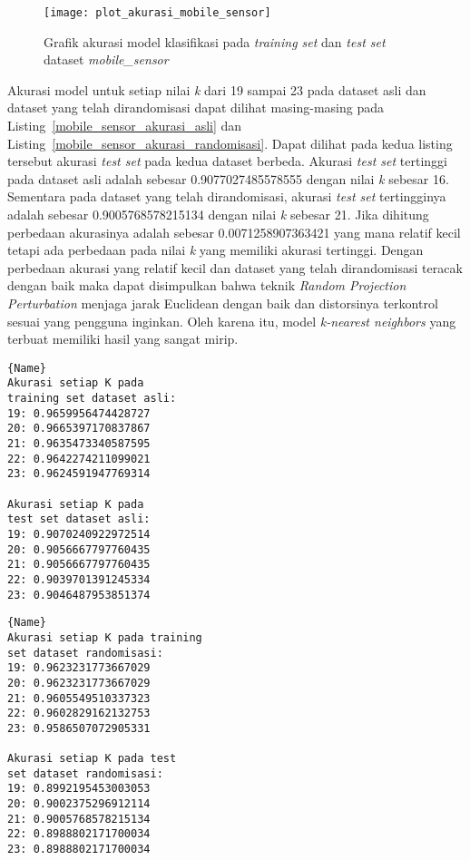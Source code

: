 \begin{figure}
	\centering
	\texttt{[image: plot\_akurasi\_mobile\_sensor]}
	\caption{Grafik akurasi model klasifikasi pada \textit{training set} dan \textit{test set} dataset \textit{mobile\_sensor}}
	\label{fig:plot_akurasi_mobile_sensor}
\end{figure}

Akurasi model untuk setiap nilai \textit{k} dari 19 sampai 23 pada dataset asli dan dataset yang telah dirandomisasi dapat dilihat masing-masing pada Listing~\ref{mobile_sensor_akurasi_asli} dan Listing~\ref{mobile_sensor_akurasi_randomisasi}. Dapat dilihat pada kedua listing tersebut akurasi \textit{test set} pada kedua dataset berbeda. Akurasi \textit{test set} tertinggi pada dataset asli adalah sebesar 0.9077027485578555 dengan nilai \textit{k} sebesar 16. Sementara pada dataset yang telah dirandomisasi, akurasi \textit{test set} tertingginya adalah sebesar 0.9005768578215134 dengan nilai \textit{k} sebesar 21. Jika dihitung perbedaan akurasinya adalah sebesar 0.0071258907363421 yang mana relatif kecil tetapi ada perbedaan pada nilai \textit{k} yang memiliki akurasi tertinggi. Dengan perbedaan akurasi yang relatif kecil dan dataset yang telah dirandomisasi teracak dengan baik maka dapat disimpulkan bahwa teknik \textit{Random Projection Perturbation} menjaga jarak Euclidean dengan baik dan distorsinya terkontrol sesuai yang pengguna inginkan. Oleh karena itu, model \textit{k-nearest neighbors} yang terbuat memiliki hasil yang sangat mirip.
	
\noindent\begin{minipage}{.46\textwidth}
	\begin{lstlisting}[caption=Akurasi Dataset Asli,frame=tlrb, label=mobile_sensor_akurasi_asli]{Name}
Akurasi setiap K pada 
training set dataset asli: 
19: 0.9659956474428727
20: 0.9665397170837867
21: 0.9635473340587595
22: 0.9642274211099021
23: 0.9624591947769314

Akurasi setiap K pada 
test set dataset asli: 
19: 0.9070240922972514
20: 0.9056667797760435
21: 0.9056667797760435
22: 0.9039701391245334
23: 0.9046487953851374
	\end{lstlisting}
	\end{minipage}\hfill
	\begin{minipage}{.46\textwidth}
	\begin{lstlisting}[caption=Akurasi Dataset Randomisasi,frame=tlrb, label=mobile_sensor_akurasi_randomisasi]{Name}
Akurasi setiap K pada training 
set dataset randomisasi: 
19: 0.9623231773667029
20: 0.9623231773667029
21: 0.9605549510337323
22: 0.9602829162132753
23: 0.9586507072905331

Akurasi setiap K pada test 
set dataset randomisasi: 
19: 0.8992195453003053
20: 0.9002375296912114
21: 0.9005768578215134
22: 0.8988802171700034
23: 0.8988802171700034
	\end{lstlisting}
\end{minipage}


